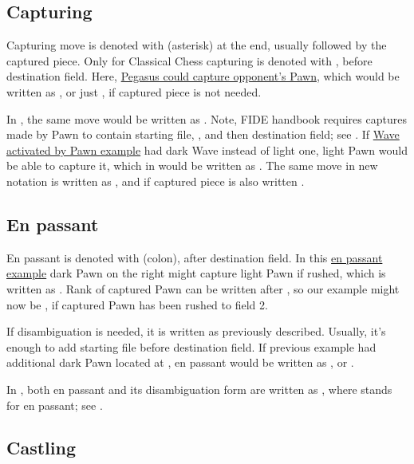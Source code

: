 \subsection*{Capturing}
\label{sec:Appendix/Notation/Capturing}

Capturing move is denoted with \alg{*} (asterisk) at the end, usually followed by the captured
piece. Only for Classical Chess capturing is denoted with , before destination field.
Here, \hyperref[fig:scn_ct_04_pegasus_movement]{Pegasus could capture opponent's Pawn}, which
would be written as , or just , if captured piece is not needed.

In , the same move would be written as . Note, FIDE handbook requires
captures made by Pawn to contain starting file, , and then destination field; see
.
If \hyperref[fig:scn_mv_22_wave_activation_by_capture_pawn]{Wave activated by Pawn example} had
dark Wave instead of light one, light Pawn would be able to capture it, which in 
would be written as . The same move in new notation is written as , and
if captured piece is also written .

\subsection*{En passant}
\label{sec:Appendix/Notation/En passant}

En passant is denoted with \alg{:} (colon), after destination field. In this
\hyperref[fig:04_croatian_ties_en_passant]{en passant example} dark Pawn on the right might capture
light Pawn if rushed, which is written as . Rank of captured Pawn can be written after
\alg{:}, so our example might now be , if captured Pawn has been rushed to field 2.

If disambiguation is needed, it is written as previously described. Usually, it's enough to add
starting file before destination field. If previous example had additional dark Pawn located at
, en passant would be written as , or .

In , both en passant and its disambiguation form are written as ,
where  stands for en passant; see .

\subsection*{Castling}
\label{sec:Appendix/Notation/Castlingn}

